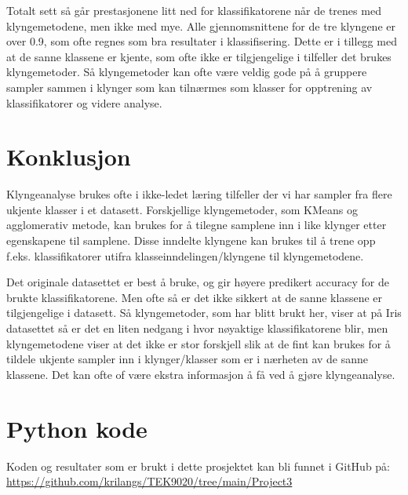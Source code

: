 \documentclass[twocolumn,norwegian]{article}
\begin{document}
	Totalt sett så går prestasjonene litt ned for klassifikatorene når de trenes med klyngemetodene, men ikke med mye. Alle gjennomsnittene for de tre klyngene er over 0.9, som ofte regnes som bra resultater i klassifisering. Dette er i tillegg med at de sanne klassene er kjente, som ofte ikke er tilgjengelige i tilfeller det brukes klyngemetoder. Så klyngemetoder kan ofte være veldig gode på å gruppere sampler sammen i klynger som kan tilnærmes som klasser for opptrening av klassifikatorer og videre analyse.


	\section{Konklusjon}
	Klyngeanalyse brukes ofte i ikke-ledet læring tilfeller der vi har sampler fra flere ukjente klasser i et datasett. Forskjellige klyngemetoder, som KMeans og agglomerativ metode, kan brukes for å tilegne samplene inn i like klynger etter egenskapene til samplene. Disse inndelte klyngene kan brukes til å trene opp f.eks. klassifikatorer utifra klasseinndelingen/klyngene til klyngemetodene.
	
	Det originale datasettet er best å bruke, og gir høyere predikert accuracy for de brukte klassifikatorene. Men ofte så er det ikke sikkert at de sanne klassene er tilgjengelige i datasett. Så klyngemetoder, som har blitt brukt her, viser at på Iris datasettet så er det en liten nedgang i hvor nøyaktige klassifikatorene blir, men klyngemetodene viser at det ikke er stor forskjell slik at de fint kan brukes for å tildele ukjente sampler inn i klynger/klasser som er i nærheten av de sanne klassene. Det kan ofte of være ekstra informasjon å få ved å gjøre klyngeanalyse.
	
	
	\appendix
	\section{Python kode}
	\label{Appendix:Kode}
	Koden og resultater som er brukt i dette prosjektet kan bli funnet i GitHub på: \url{https://github.com/krilangs/TEK9020/tree/main/Project3}
	
\end{document}
